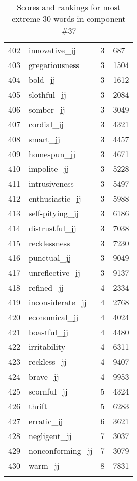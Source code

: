 \begin{longtable}[!htbp]{| rlr@{.}l |}
    402 & innovative\_jj & 3 & 687 \\
    403 & gregariousness & 3 & 1504 \\
    404 & bold\_jj & 3 & 1612 \\
    405 & slothful\_jj & 3 & 2084 \\
    406 & somber\_jj & 3 & 3049 \\
    407 & cordial\_jj & 3 & 4321 \\
    408 & smart\_jj & 3 & 4457 \\
    409 & homespun\_jj & 3 & 4671 \\
    410 & impolite\_jj & 3 & 5228 \\
    411 & intrusiveness & 3 & 5497 \\
    412 & enthusiastic\_jj & 3 & 5988 \\
    413 & self-pitying\_jj & 3 & 6186 \\
    414 & distrustful\_jj & 3 & 7038 \\
    415 & recklessness & 3 & 7230 \\
    416 & punctual\_jj & 3 & 9049 \\
    417 & unreflective\_jj & 3 & 9137 \\
    418 & refined\_jj & 4 & 2334 \\
    419 & inconsiderate\_jj & 4 & 2768 \\
    420 & economical\_jj & 4 & 4024 \\
    421 & boastful\_jj & 4 & 4480 \\
    422 & irritability & 4 & 6311 \\
    423 & reckless\_jj & 4 & 9407 \\
    424 & brave\_jj & 4 & 9953 \\
    425 & scornful\_jj & 5 & 4324 \\
    426 & thrift & 5 & 6283 \\
    427 & erratic\_jj & 6 & 3621 \\
    428 & negligent\_jj & 7 & 3037 \\
    429 & nonconforming\_jj & 7 & 3079 \\
    430 & warm\_jj & 8 & 7831 \\
    \hline
    \caption{Scores and rankings for most extreme 30 words in component \#37} \\
\end{longtable}
